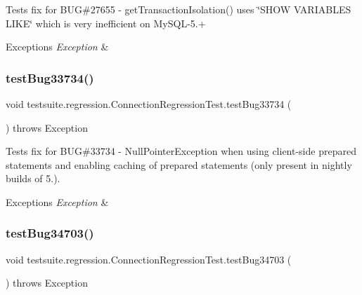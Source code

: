 Tests fix for B\+UG\#27655 -\/ get\+Transaction\+Isolation() uses \char`\"{}\+S\+H\+O\+W V\+A\+R\+I\+A\+B\+L\+E\+S L\+I\+K\+E\char`\"{} which is very inefficient on My\+S\+Q\+L-\/5.+


\begin{DoxyExceptions}{Exceptions}
{\em Exception} & \\
\hline
\end{DoxyExceptions}
\mbox{\label{classtestsuite_1_1regression_1_1_connection_regression_test_a06827fd6f7095ca49c066279b2dd41a6}} 
\subsubsection{\texorpdfstring{test\+Bug33734()}{testBug33734()}}
{\footnotesize\ttfamily void testsuite.\+regression.\+Connection\+Regression\+Test.\+test\+Bug33734 (\begin{DoxyParamCaption}{ }\end{DoxyParamCaption}) throws Exception}

Tests fix for B\+UG\#33734 -\/ Null\+Pointer\+Exception when using client-\/side prepared statements and enabling caching of prepared statements (only present in nightly builds of 5.).


\begin{DoxyExceptions}{Exceptions}
{\em Exception} & \\
\hline
\end{DoxyExceptions}
\mbox{\label{classtestsuite_1_1regression_1_1_connection_regression_test_ab8a5be5d0f3c870006614f5aa94dd750}} 
\subsubsection{\texorpdfstring{test\+Bug34703()}{testBug34703()}}
{\footnotesize\ttfamily void testsuite.\+regression.\+Connection\+Regression\+Test.\+test\+Bug34703 (\begin{DoxyParamCaption}{ }\end{DoxyParamCaption}) throws Exception}

